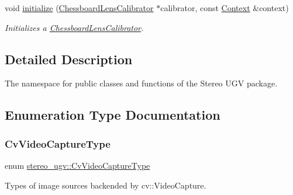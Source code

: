 \begin{DoxyCompactItemize}
void \hyperlink{namespacestereo__ugv_a8e8ff522fb8d2300fcdfc02ab0025e98}{initialize} (\hyperlink{classstereo__ugv_1_1ChessboardLensCalibrator}{Chessboard\+Lens\+Calibrator} $\ast$calibrator, const \hyperlink{classstereo__ugv_1_1Context}{Context} \&context)
\begin{DoxyCompactList}\small\item\em Initializes a \hyperlink{classstereo__ugv_1_1ChessboardLensCalibrator}{Chessboard\+Lens\+Calibrator}. \end{DoxyCompactList}\end{DoxyCompactItemize}


\subsection{Detailed Description}
The namespace for public classes and functions of the Stereo U\+GV package. 

\subsection{Enumeration Type Documentation}
\mbox{\label{namespacestereo__ugv_a5c139e7cfac12e9270ca903f1ce2e4bc}} 
\subsubsection{\texorpdfstring{Cv\+Video\+Capture\+Type}{CvVideoCaptureType}}
{\footnotesize\ttfamily enum \hyperlink{namespacestereo__ugv_a5c139e7cfac12e9270ca903f1ce2e4bc}{stereo\+\_\+ugv\+::\+Cv\+Video\+Capture\+Type}\hspace{0.3cm}{\ttfamily [strong]}}



Types of image sources backended by cv\+::\+Video\+Capture. 

